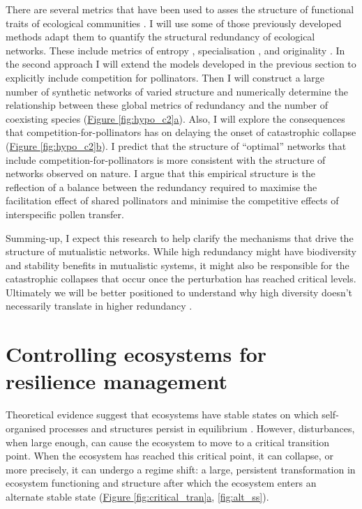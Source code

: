 \documentclass[a4paper]{article}
\begin{document}
There are several metrics that have been used to asses the structure of functional traits of ecological communities \autocite{Mouillot2013}.
I will use some of those previously developed methods adapt them to quantify the structural redundancy of ecological networks.
These include metrics of entropy \autocite{Mokany2008}, specialisation \autocite{Villeger2010}, and originality \autocite{Mouillot2008}.
In the second approach I will extend the models developed in the previous section to explicitly include competition for pollinators.
Then I will construct a large number of synthetic networks of varied structure and numerically determine the relationship between these global metrics of redundancy and the number of coexisting species (\hyperref[fig:hypo_c2]{Figure \ref{fig:hypo_c2}a}).
Also, I will explore the consequences that competition-for-pollinators has on delaying the onset of catastrophic collapse (\hyperref[fig:hypo_c2]{Figure \ref{fig:hypo_c2}b}).
I predict that the structure of ``optimal'' networks that include competition-for-pollinators is more consistent with the structure of networks observed on nature.
I argue that this empirical structure is the reflection of a balance between the redundancy required to maximise the facilitation effect of shared pollinators and minimise the competitive effects of interspecific pollen transfer.

Summing-up, I expect this research to help clarify the mechanisms that drive the structure of mutualistic networks.
While high redundancy might have biodiversity and stability benefits in mutualistic systems, it might also be responsible for the catastrophic collapses that occur once the perturbation has reached critical levels.
Ultimately we will be better positioned to understand why high diversity doesn't necessarily translate in higher redundancy \autocite{Bellwood2003b}.










\section{Controlling ecosystems for resilience management}

Theoretical evidence suggest that ecosystems have stable states on which self-organised processes and structures persist in equilibrium \autocite{Gunderson2000,Ives2007}.
However, disturbances, when large enough, can cause the ecosystem to move to a critical transition point.
When the ecosystem has reached this critical point, it can collapse, or more precisely, it can undergo a regime shift: a large, persistent transformation in ecosystem functioning and structure after which the ecosystem enters an alternate stable state \autocite{Holling1973,May1976, Gunderson2000} (\hyperref[fig:critical_tran]{Figure \ref{fig:critical_tran}a}, \ref{fig:alt_ss}).
\end{document}
